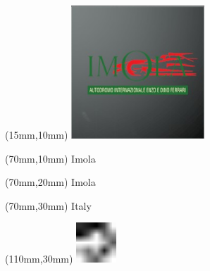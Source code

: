 \null\newpage
\begin{textblock*}{50mm}(15mm,10mm)%
\includegraphics[width=50mm]{LG/2015-05-20_00083.png}
\end{textblock*}
\begin{textblock*}{130mm}(70mm,10mm)%
{\fontsize{20}{20}\selectfont Imola}\\
\end{textblock*}
\begin{textblock*}{120mm}(70mm,20mm)%
{\fontsize{16}{16}\selectfont Imola}\\
\end{textblock*}
\begin{textblock*}{120mm}(70mm,30mm)%
{\fontsize{12}{12}\selectfont Italy}
\end{textblock*}
\begin{textblock*}{30mm}(110mm,30mm)%
\centering
\includegraphics[height=15mm]{icons/fa-rotate-left.pdf}
\end{textblock*}
